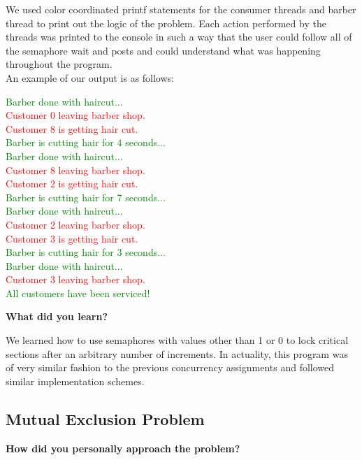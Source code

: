 \documentclass[10pt,letterpaper,draftclsnofoot,onecolumn]{IEEEtran}
\begin{document}
\noindent We used color coordinated printf statements for the consumer threads and barber thread to print out the logic of the problem. Each action performed by the threads was printed to the console in such a way that the user could follow all of the semaphore wait and posts and could understand what was happening throughout the program.\\
\medskip An example of our output is as follows:

{\selectfont
\noindent \textcolor{green}{Barber done with haircut...}\\
\textcolor{red}{Customer 0 leaving barber shop.}\\
\textcolor{red}{Customer 8 is getting hair cut.}\\
\textcolor{green}{Barber is cutting hair for 4 seconds...}\\
\textcolor{green}{Barber done with haircut...}\\
\textcolor{red}{Customer 8 leaving barber shop.}\\
\textcolor{red}{Customer 2 is getting hair cut.}\\
\textcolor{green}{Barber is cutting hair for 7 seconds...}\\
\textcolor{green}{Barber done with haircut...}\\
\textcolor{red}{Customer 2 leaving barber shop.}\\
\textcolor{red}{Customer 3 is getting hair cut.}\\
\textcolor{green}{Barber is cutting hair for 3 seconds...}\\
\textcolor{green}{Barber done with haircut...}\\
\textcolor{red}{Customer 3 leaving barber shop.}\\
\textcolor{green}{All customers have been serviced!}\\
}
\bigskip

\noindent\textbf{What did you learn?}
\medskip

\medskip

\noindent We learned how to use semaphores with values other than 1 or 0 to lock critical sections after an arbitrary number of increments. In actuality, this program was of very similar fashion to the previous concurrency assignments and followed similar implementation schemes.
\medskip

\subsection{Mutual Exclusion Problem}
\noindent\textbf{How did you personally approach the problem?}
\medskip
\end{document}
